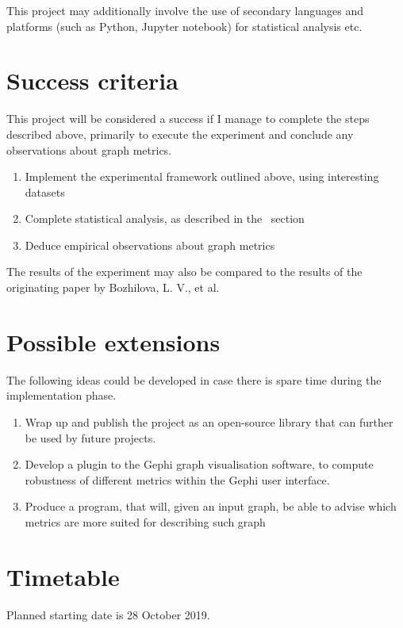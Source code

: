 This project may additionally involve the use of secondary languages and platforms (such as Python, Jupyter notebook) for statistical analysis etc.

\section*{Success criteria}

This project will be considered a success if I manage to complete the steps described above, primarily to execute the experiment and conclude any observations about graph metrics.

\begin{enumerate}
    \item Implement the experimental framework outlined above, using interesting datasets
    \item Complete statistical analysis, as described in the~ section
    \item Deduce empirical observations about graph metrics
\end{enumerate}

The results of the experiment may also be compared to the results of the originating paper by Bozhilova, L. V., et al.

\section*{Possible extensions}

The following ideas could be developed in case there is spare time during the implementation phase.

\begin{enumerate}
    \item Wrap up and publish the project as an open-source library that can further be used by future projects.
    \item Develop a plugin to the Gephi graph visualisation software, to compute robustness of different metrics within the Gephi user interface.
    \item Produce a program, that will, given an input graph, be able to advise which metrics are more suited for describing such graph
\end{enumerate}

\section*{Timetable}

Planned starting date is 28 October 2019.

